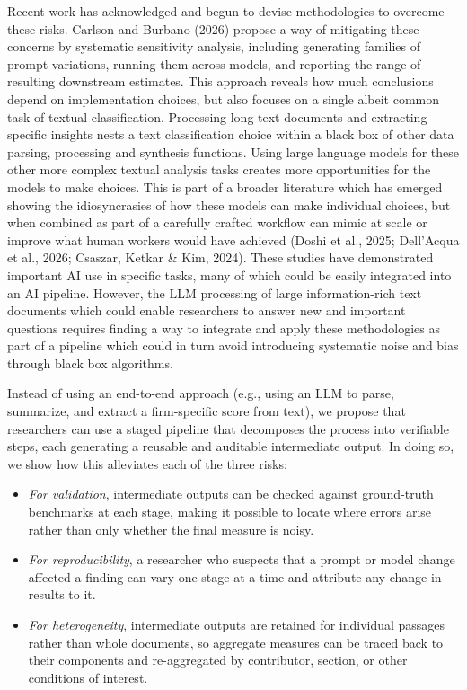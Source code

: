\documentclass[11pt]{article}
\begin{document}
Recent work has acknowledged and begun to devise methodologies to overcome these risks. Carlson and Burbano (2026) propose a way of mitigating these concerns by systematic sensitivity analysis, including generating families of prompt variations, running them across models, and reporting the range of resulting downstream estimates. This approach reveals how much conclusions depend on implementation choices, but also focuses on a single albeit common task of textual classification. Processing long text documents and extracting specific insights nests a text classification choice within a black box of other data parsing, processing and synthesis functions. Using large language models for these other more complex textual analysis tasks creates more opportunities for the models to make choices. This is part of a broader literature which has emerged showing the idiosyncrasies of how these models can make individual choices, but when combined as part of a carefully crafted workflow can mimic at scale or improve what human workers would have achieved (Doshi et al., 2025; Dell'Acqua et al., 2026; Csaszar, Ketkar \& Kim, 2024). These studies have demonstrated important AI use in specific tasks, many of which could be easily integrated into an AI pipeline. However, the LLM processing of large information-rich text documents which could enable researchers to answer new and important questions requires finding a way to integrate and apply these methodologies as part of a pipeline which could in turn avoid introducing systematic noise and bias through black box algorithms.

Instead of using an end-to-end approach (e.g., using an LLM to parse, summarize, and extract a firm-specific score from text), we propose that researchers can use a staged pipeline that decomposes the process into verifiable steps, each generating a reusable and auditable intermediate output. In doing so, we show how this alleviates each of the three risks:
\begin{itemize}
    \item \textit{For validation}, intermediate outputs can be checked against ground-truth benchmarks at each stage, making it possible to locate where errors arise rather than only whether the final measure is noisy.
    \item \textit{For reproducibility}, a researcher who suspects that a prompt or model change affected a finding can vary one stage at a time and attribute any change in results to it.
    \item \textit{For heterogeneity}, intermediate outputs are retained for individual passages rather than whole documents, so aggregate measures can be traced back to their components and re-aggregated by contributor, section, or other conditions of interest.
\end{itemize}
\end{document}
